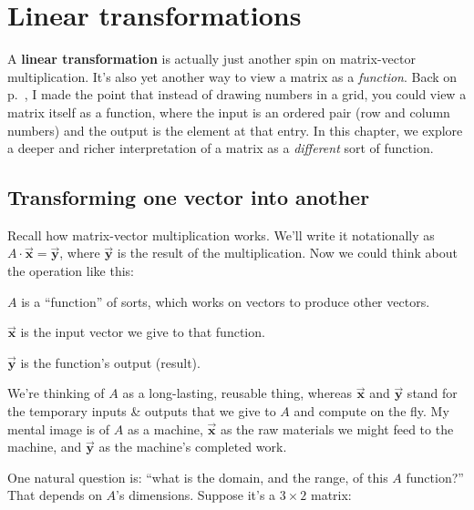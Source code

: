 
\chapter{Linear transformations}


A \textbf{linear transformation} is actually just another spin on matrix-vector
multiplication. It's also yet another way to view a matrix as a
\textit{function}. Back on p.~\pageref{matrixIsFunction}, I made the point that
instead of drawing numbers in a grid, you could view a matrix itself as a
function, where the input is an ordered pair (row and column numbers) and the
output is the element at that entry. In this chapter, we explore a deeper and
richer interpretation of a matrix as a \textit{different} sort of function.

\section{Transforming one vector into another}

Recall how matrix-vector multiplication works. We'll write it notationally as
$A \cdot \overrightarrow{\textbf{x}} = \overrightarrow{\textbf{y}}$, where
$\overrightarrow{\textbf{y}}$ is the result of the multiplication. Now we could
think about the operation like this:

\begin{compactitem}
\item $A$ is a ``function'' of sorts, which works on vectors to produce other
vectors.
\item $\overrightarrow{\textbf{x}}$ is the input vector we give to that
function.
\item $\overrightarrow{\textbf{y}}$ is the function's output (result).
\end{compactitem}

We're thinking of $A$ as a long-lasting, reusable thing, whereas
$\overrightarrow{\textbf{x}}$ and $\overrightarrow{\textbf{y}}$ stand for the
temporary inputs \& outputs that we give to $A$ and compute on the fly. My
mental image is of $A$ as a machine, $\overrightarrow{\textbf{x}}$ as the raw
materials we might feed to the machine, and $\overrightarrow{\textbf{y}}$ as
the machine's completed work.

One natural question is: ``what is the domain, and the range, of this $A$
function?'' That depends on $A$'s dimensions. Suppose it's a $3\times 2$
matrix:

